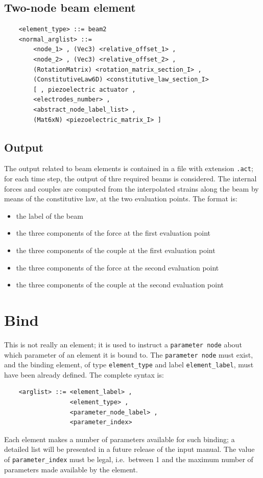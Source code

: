 \subsection{Two-node beam element}
\begin{verbatim}
    <element_type> ::= beam2
    <normal_arglist> ::=
        <node_1> , (Vec3) <relative_offset_1> ,
        <node_2> , (Vec3) <relative_offset_2> ,
        (RotationMatrix) <rotation_matrix_section_I> ,
        (ConstitutiveLaw6D) <constitutive_law_section_I>
        [ , piezoelectric actuator , 
        <electrodes_number> ,
        <abstract_node_label_list> ,
        (Mat6xN) <piezoelectric_matrix_I> ]
\end{verbatim}

\subsection{Output}
The output related to beam elements is contained in a file with extension 
\texttt{.act}; for each time step, the output of thre required beams is
considered.
The internal forces and couples are computed from the interpolated strains
along the beam by means of the constitutive law, at the two evaluation
points. 
The format is:
\begin{itemize}
    \item the label of the beam
    \item the three components of the force at the first evaluation point
    \item the three components of the couple at the first evaluation point
    \item the three components of the force at the second evaluation point
    \item the three components of the couple at the second evaluation point    
\end{itemize}



\section{Bind}\label{sec:EL-BIND}
This is not really an element; it is used to instruct a \texttt{parameter node}
about which parameter of an element it is bound to.
The \texttt{parameter node} must exist, and the binding element, of type 
\texttt{element\_type} and label \texttt{element\_label}, must have been already 
defined.
The complete syntax is:
\begin{verbatim}
    <arglist> ::= <element_label> , 
                  <element_type> ,
                  <parameter_node_label> , 
                  <parameter_index>
\end{verbatim}
Each element makes a number of parameters available for such binding; a
detailed list will be presented in a future release of the input manual.
The value of \texttt{parameter\_index} must be legal, i.e.\ between 1 and the
maximum number of parameters made available by the element.




